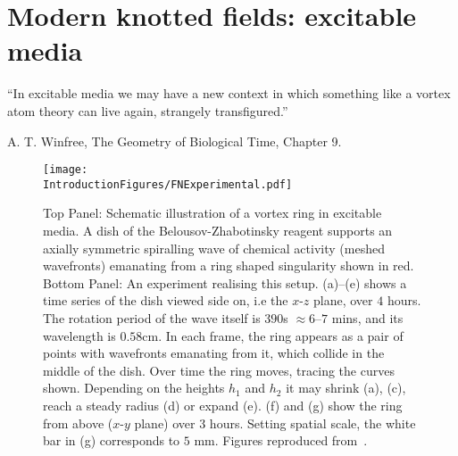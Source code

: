 \section{Modern knotted fields: excitable media}
\label{sec:FN}

\setlength{\epigraphwidth}{5in} 
\epigraph{``In excitable media we may have a new context in which something like a vortex atom theory can live again, strangely transfigured.''}{A. T. Winfree, The Geometry of Biological Time, Chapter 9.}
\begin{figure}[htbp]
\centering
\texttt{[image: \\IntroductionFigures/FNExperimental.pdf]}
\caption[Experiments on vortex rings in excitable media.]{Top Panel: Schematic illustration of a vortex ring in excitable media. A dish of the Belousov-Zhabotinsky reagent supports an axially symmetric spiralling wave of chemical activity (meshed wavefronts) emanating from a ring shaped singularity shown in red. Bottom Panel: An experiment realising this setup. (a)--(e) shows a time series of the dish viewed side on, i.e the $x$-$z$ plane, over $4$ hours. The rotation period of the wave itself is $390$s $\approx 6$--$ 7 $ mins, and its wavelength is $0.58$cm. In each frame, the ring appears as a pair of points with wavefronts emanating from it, which collide in the middle of the dish. Over time the ring moves, tracing the curves shown. Depending on the heights $h_1$ and $h_2$ it may shrink (a), (c), reach a steady radius (d) or expand (e). (f) and (g) show the ring from above ($x$-$y$ plane) over $3$ hours. Setting spatial scale, the white bar in (g) corresponds to $5$ mm. Figures reproduced from~\citep{Totz2015}.}
\label{fig:FNExperimental}
\end{figure}

